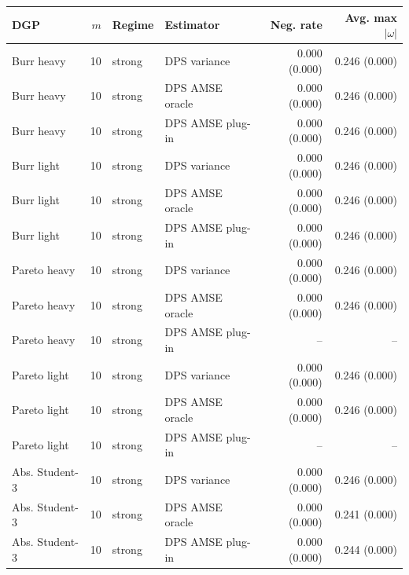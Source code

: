 \begin{tabular}{lrllrr}
\toprule
DGP & $m$ & Regime & Estimator & Neg. rate & Avg. max $|\omega|$ \\
\midrule
Burr heavy & 10 & strong & DPS variance & 0.000 (0.000) & 0.246 (0.000) \\
Burr heavy & 10 & strong & DPS AMSE oracle & 0.000 (0.000) & 0.246 (0.000) \\
Burr heavy & 10 & strong & DPS AMSE plug-in & 0.000 (0.000) & 0.246 (0.000) \\
Burr light & 10 & strong & DPS variance & 0.000 (0.000) & 0.246 (0.000) \\
Burr light & 10 & strong & DPS AMSE oracle & 0.000 (0.000) & 0.246 (0.000) \\
Burr light & 10 & strong & DPS AMSE plug-in & 0.000 (0.000) & 0.246 (0.000) \\
Pareto heavy & 10 & strong & DPS variance & 0.000 (0.000) & 0.246 (0.000) \\
Pareto heavy & 10 & strong & DPS AMSE oracle & 0.000 (0.000) & 0.246 (0.000) \\
Pareto heavy & 10 & strong & DPS AMSE plug-in & -- & -- \\
Pareto light & 10 & strong & DPS variance & 0.000 (0.000) & 0.246 (0.000) \\
Pareto light & 10 & strong & DPS AMSE oracle & 0.000 (0.000) & 0.246 (0.000) \\
Pareto light & 10 & strong & DPS AMSE plug-in & -- & -- \\
Abs. Student-3 & 10 & strong & DPS variance & 0.000 (0.000) & 0.246 (0.000) \\
Abs. Student-3 & 10 & strong & DPS AMSE oracle & 0.000 (0.000) & 0.241 (0.000) \\
Abs. Student-3 & 10 & strong & DPS AMSE plug-in & 0.000 (0.000) & 0.244 (0.000) \\
\bottomrule
\end{tabular}
